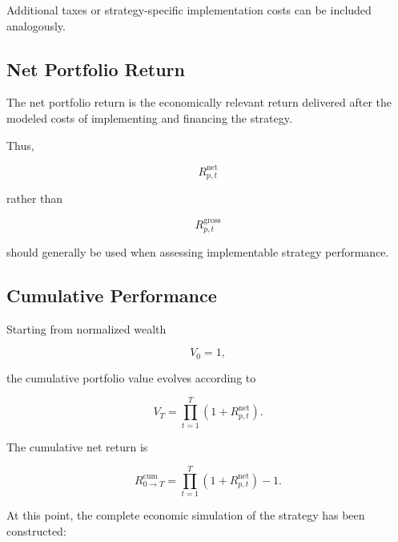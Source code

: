\documentclass[11pt,a4paper]{article}
\begin{document}
Additional taxes or strategy-specific implementation costs can be included
analogously.


\subsection{Net Portfolio Return}

The net portfolio return is the economically relevant return delivered after
the modeled costs of implementing and financing the strategy.

Thus,

\begin{equation}
\boxed{
R_{p,t}^{\mathrm{net}}
}
\end{equation}

rather than

\begin{equation}
R_{p,t}^{\mathrm{gross}}
\end{equation}

should generally be used when assessing implementable strategy performance.


\subsection{Cumulative Performance}

Starting from normalized wealth

\begin{equation}
V_0=1,
\end{equation}

the cumulative portfolio value evolves according to

\begin{equation}
\boxed{
V_T
=
\prod_{t=1}^{T}
\left(
1+
R_{p,t}^{\mathrm{net}}
\right).
}
\end{equation}

The cumulative net return is

\begin{equation}
\boxed{
R_{0\rightarrow T}^{\mathrm{cum}}
=
\prod_{t=1}^{T}
\left(
1+
R_{p,t}^{\mathrm{net}}
\right)
-1.
}
\end{equation}

At this point, the complete economic simulation of the strategy has been
constructed:
\end{document}
